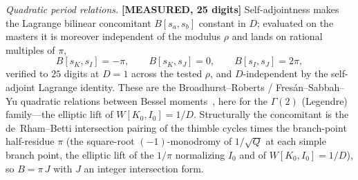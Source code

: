 \documentclass[aps,pra,twocolumn,superscriptaddress,longbibliography]{revtex4-2}
\begin{document}
\emph{Quadratic period relations.}  \textbf{[MEASURED, 25 digits]}
Self-adjointness makes the Lagrange bilinear concomitant $B[s_{a},s_{b}]$
constant in $D$; evaluated on the masters it is moreover independent of the
modulus $\rho$ and lands on rational multiples of $\pi$,
%
\begin{equation}
B[s_{K},s_{I}]=-\pi,\qquad B[s_{K},s_{J}]=0,\qquad B[s_{I},s_{J}]=2\pi,
\end{equation}
%
verified to $25$ digits at $D=1$ across the tested $\rho$, and $D$-independent
by the self-adjoint Lagrange identity.
These are the Broadhurst--Roberts / Fresán--Sabbah--Yu
quadratic relations between Bessel
moments~\cite{fresansabbahyu2023,zhou_quadratic2021}, here for the
$\Gamma(2)$ (Legendre) family---the elliptic lift of $W[K_{0},I_{0}]=1/D$.
Structurally the concomitant is the de~Rham--Betti intersection pairing of the
thimble cycles times the branch-point half-residue $\pi$ (the square-root
$(-1)$-monodromy of $1/\sqrt{Q}$ at each simple branch point, the elliptic lift of
the $1/\pi$ normalizing $I_{0}$ and of $W[K_{0},I_{0}]=1/D$), so $B=\pi\,J$ with $J$
an integer intersection form.
\end{document}
